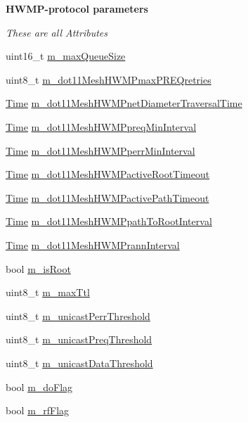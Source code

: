\begin{Indent}{\bf H\+W\+M\+P-\/protocol parameters}\par
{\em These are all Attributes }\begin{DoxyCompactItemize}
\item 
uint16\+\_\+t \hyperlink{classns3_1_1dot11s_1_1HwmpProtocol_ae9573ffc51b306002cc6a7c13132b995}{m\+\_\+max\+Queue\+Size}
\item 
uint8\+\_\+t \hyperlink{classns3_1_1dot11s_1_1HwmpProtocol_afb618f3a22ef3fff0e664fac76040933}{m\+\_\+dot11\+Mesh\+H\+W\+M\+Pmax\+P\+R\+E\+Qretries}
\item 
\hyperlink{classns3_1_1Time}{Time} \hyperlink{classns3_1_1dot11s_1_1HwmpProtocol_a3f26703a06f87191bec8a9ad3506ca36}{m\+\_\+dot11\+Mesh\+H\+W\+M\+Pnet\+Diameter\+Traversal\+Time}
\item 
\hyperlink{classns3_1_1Time}{Time} \hyperlink{classns3_1_1dot11s_1_1HwmpProtocol_ac51f536a9d3735b2e07440a1c2768a5f}{m\+\_\+dot11\+Mesh\+H\+W\+M\+Ppreq\+Min\+Interval}
\item 
\hyperlink{classns3_1_1Time}{Time} \hyperlink{classns3_1_1dot11s_1_1HwmpProtocol_a89cb14f3f69474e5c6e39bc40bfbc839}{m\+\_\+dot11\+Mesh\+H\+W\+M\+Pperr\+Min\+Interval}
\item 
\hyperlink{classns3_1_1Time}{Time} \hyperlink{classns3_1_1dot11s_1_1HwmpProtocol_ac00e9fdbf81e8597acc90b02ba3455a9}{m\+\_\+dot11\+Mesh\+H\+W\+M\+Pactive\+Root\+Timeout}
\item 
\hyperlink{classns3_1_1Time}{Time} \hyperlink{classns3_1_1dot11s_1_1HwmpProtocol_a435cff65c1ec1b398186c246ea02f695}{m\+\_\+dot11\+Mesh\+H\+W\+M\+Pactive\+Path\+Timeout}
\item 
\hyperlink{classns3_1_1Time}{Time} \hyperlink{classns3_1_1dot11s_1_1HwmpProtocol_ab01e8ec195410954227b273627e1d733}{m\+\_\+dot11\+Mesh\+H\+W\+M\+Ppath\+To\+Root\+Interval}
\item 
\hyperlink{classns3_1_1Time}{Time} \hyperlink{classns3_1_1dot11s_1_1HwmpProtocol_a253b285768b092f926638d9b517085f4}{m\+\_\+dot11\+Mesh\+H\+W\+M\+Prann\+Interval}
\item 
bool \hyperlink{classns3_1_1dot11s_1_1HwmpProtocol_a4664b89c3ad6d74c0010e64c2ac1dc03}{m\+\_\+is\+Root}
\item 
uint8\+\_\+t \hyperlink{classns3_1_1dot11s_1_1HwmpProtocol_aeb6a1f36357cb71cf8d41749f65a3edc}{m\+\_\+max\+Ttl}
\item 
uint8\+\_\+t \hyperlink{classns3_1_1dot11s_1_1HwmpProtocol_aefbf7cb9cf17384c98b897048222fbf6}{m\+\_\+unicast\+Perr\+Threshold}
\item 
uint8\+\_\+t \hyperlink{classns3_1_1dot11s_1_1HwmpProtocol_a3461bf4ea09ad4241bf000d499e46e02}{m\+\_\+unicast\+Preq\+Threshold}
\item 
uint8\+\_\+t \hyperlink{classns3_1_1dot11s_1_1HwmpProtocol_a1306d9f72e6800618a039c0a681166ad}{m\+\_\+unicast\+Data\+Threshold}
\item 
bool \hyperlink{classns3_1_1dot11s_1_1HwmpProtocol_abc04d85e45d9f1584d143bb81b8e1b8f}{m\+\_\+do\+Flag}
\item 
bool \hyperlink{classns3_1_1dot11s_1_1HwmpProtocol_a8b777951609e6dc5af0f56275c964ad5}{m\+\_\+rf\+Flag}
\end{DoxyCompactItemize}
\end{Indent}
